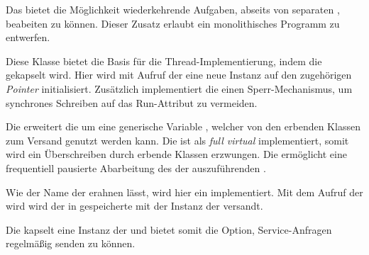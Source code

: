 
Das  bietet die Möglichkeit wiederkehrende Aufgaben, abseits von separaten \Node[s], beabeiten zu können. Dieser Zusatz erlaubt ein monolithisches Programm zu entwerfen.


Diese Klasse bietet die Basis für die Thread-Implementierung, indem die  gekapselt wird. Hier wird mit Aufruf der  eine neue Instanz auf den zugehörigen \textit{Pointer} initialisiert. Zusätzlich implementiert die  einen Sperr-Mechanismus, um synchrones Schreiben auf das Run-Attribut zu vermeiden.


Die  erweitert die  um eine generische Variable , welcher von den erbenden Klassen zum Versand genutzt werden kann. Die  ist als \textit{full virtual} implementiert, somit wird ein Überschreiben durch erbende Klassen erzwungen. Die  ermöglicht eine frequentiell pausierte Abarbeitung des der auszuführenden .



Wie der Name der  erahnen lässt, wird hier ein  implementiert. Mit dem Aufruf der  wird wird der in  gespeicherte  mit der Instanz der  versandt.


Die  kapselt eine Instanz der  und bietet somit die Option, Service-Anfragen regelmäßig senden zu können.